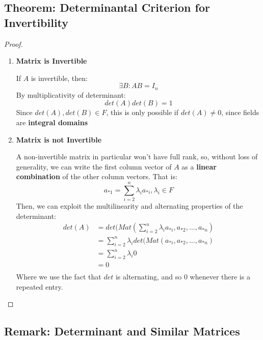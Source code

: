 \documentclass{exam}
\begin{document}
\subsection{Theorem: Determinantal Criterion for Invertibility}


\begin{proof}

\begin{enumerate}
    \item \textbf{Matrix is Invertible}
    
    If $A$ is invertible, then:
    \[
    \exists B : AB = I_n
    \]
    By multiplicativity of determinant:
    \[
    det(A)det(B) = 1
    \]
    Since $det(A),det(B) \in F$, this is only possible if $det(A) \neq 0$, since fields are \textbf{integral domains}
    
    \item \textbf{Matrix is not Invertible}
    
    A non-invertible matrix in particular won't have full rank, so, without loss of generality, we can write the first column vector of $A$ as a \textbf{linear combination} of the other column vectors. That is:
    \[
    a_{*1} = \sum_{i = 2}^n \lambda_ia_{*i}, \lambda_i \in F
    \]
    Then, we can exploit the multilinearity and alternating properties of the determinant:
    \begin{align*}
        det(A) &= det(Mat(\sum_{i = 2}^n \lambda_ia_{*i}, a_{*2}, \ldots, a_{*n}) \\
        &= \sum_{i = 2}^n \lambda_i det(Mat(a_{*i}, a_{*2}, \ldots, a_{*n}) \\
        &= \sum_{i = 2}^n \lambda_i 0 \\
        &= 0 \\
    \end{align*}
    Where we use the fact that $det$ is alternating, and so 0 whenever there is a repeated entry.
\end{enumerate}

\end{proof}

\subsection{Remark: Determinant and Similar Matrices}
\end{document}
